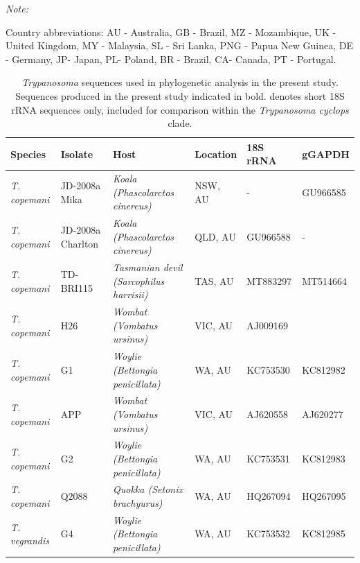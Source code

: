 \documentclass[a4paper, nobind]{templates/ociamthesis}
\begin{document}
\begin{landscape}\begingroup\fontsize{8}{10}\selectfont

\begin{ThreePartTable}
\begin{TableNotes}
\item \textit{Note: } 
\item Country abbreviations: AU - Australia, GB - Brazil, MZ - Mozambique, UK - United Kingdom, MY - Malaysia, SL - Sri Lanka, PNG - Papua New Guinea, DE - Germany, JP- Japan, PL- Poland, BR - Brazil, CA- Canada, PT - Portugal.
\end{TableNotes}
\begin{longtabu} to 
\caption[Sequences used for phylogenetic analysis of \textit{Trypanosoma} in Tasmanian devils.]{\label{tab:TA61}\textit{Trypanosoma} sequences used in phylogenetic analysis in the present study. Sequences produced in the present study indicated in bold. denotes short 18S rRNA sequences only, included for comparison within the \textit{Trypanosoma cyclops} clade.}\\
\toprule
Species & Isolate & Host & Location & 18S rRNA & gGAPDH\\
\midrule
\em{T. copemani} & JD-2008a Mika & \em{Koala (Phascolarctos cinereus)} & NSW, AU & - & GU966585\\
\em{T. copemani} & JD-2008a Charlton & \em{Koala (Phascolarctos cinereus)} & QLD, AU & GU966588 & -\\
\em{T. copemani} & TD-BRI115 & \em{Tasmanian devil (Sarcophilus harrisii)} & TAS, AU & MT883297 & MT514664\\
\em{T. copemani} & H26 & \em{Wombat (Vombatus ursinus)} & VIC, AU & AJ009169 & \\
\em{T. copemani} & G1 & \em{Woylie (Bettongia penicillata)} & WA, AU & KC753530 & KC812982\\
\em{T. copemani} & APP & \em{Wombat (Vombatus ursinus)} & VIC, AU & AJ620558 & AJ620277\\
\em{T. copemani} & G2 & \em{Woylie (Bettongia penicillata)} & WA, AU & KC753531 & KC812983\\
\em{T. copemani} & Q2088 & \em{Quokka (Setonix brachyurus)} & WA, AU & HQ267094 & HQ267095\\
\em{T. vegrandis} & G4 & \em{Woylie (Bettongia penicillata)} & WA, AU & KC753532 & KC812985\\

\end{longtabu}
\end{ThreePartTable}
\end{landscape}
\end{document}
